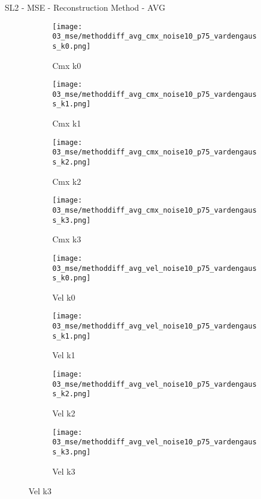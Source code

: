 \documentclass{beamer}
\begin{document}
\begin{frame}{SL2 - MSE - Reconstruction Method - AVG}{}
\begin{figure}
\begin{subfigure}{0.24\textwidth}
\texttt{[image: 03\_mse/methoddiff\_avg\_cmx\_noise10\_p75\_vardengauss\_k0.png]}
\vspace{-20pt}
\caption*{\tiny Cmx k0}
\end{subfigure}
\begin{subfigure}{0.24\textwidth}
\texttt{[image: 03\_mse/methoddiff\_avg\_cmx\_noise10\_p75\_vardengauss\_k1.png]}
\vspace{-20pt}
\caption*{\tiny Cmx k1}
\end{subfigure}
\begin{subfigure}{0.24\textwidth}
\texttt{[image: 03\_mse/methoddiff\_avg\_cmx\_noise10\_p75\_vardengauss\_k2.png]}
\vspace{-20pt}
\caption*{\tiny Cmx k2}
\end{subfigure}
\begin{subfigure}{0.24\textwidth}
\texttt{[image: 03\_mse/methoddiff\_avg\_cmx\_noise10\_p75\_vardengauss\_k3.png]}
\vspace{-20pt}
\caption*{\tiny Cmx k3}
\end{subfigure}

\begin{subfigure}{0.24\textwidth}
\texttt{[image: 03\_mse/methoddiff\_avg\_vel\_noise10\_p75\_vardengauss\_k0.png]}
\vspace{-20pt}
\caption*{\tiny Vel k0}
\end{subfigure}
\begin{subfigure}{0.24\textwidth}
\texttt{[image: 03\_mse/methoddiff\_avg\_vel\_noise10\_p75\_vardengauss\_k1.png]}
\vspace{-20pt}
\caption*{\tiny Vel k1}
\end{subfigure}
\begin{subfigure}{0.24\textwidth}
\texttt{[image: 03\_mse/methoddiff\_avg\_vel\_noise10\_p75\_vardengauss\_k2.png]}
\vspace{-20pt}
\caption*{\tiny Vel k2}
\end{subfigure}
\begin{subfigure}{0.24\textwidth}
\texttt{[image: 03\_mse/methoddiff\_avg\_vel\_noise10\_p75\_vardengauss\_k3.png]}
\vspace{-20pt}
\caption*{\tiny Vel k3}
\end{subfigure}
\end{figure}
\end{frame}
\end{document}
